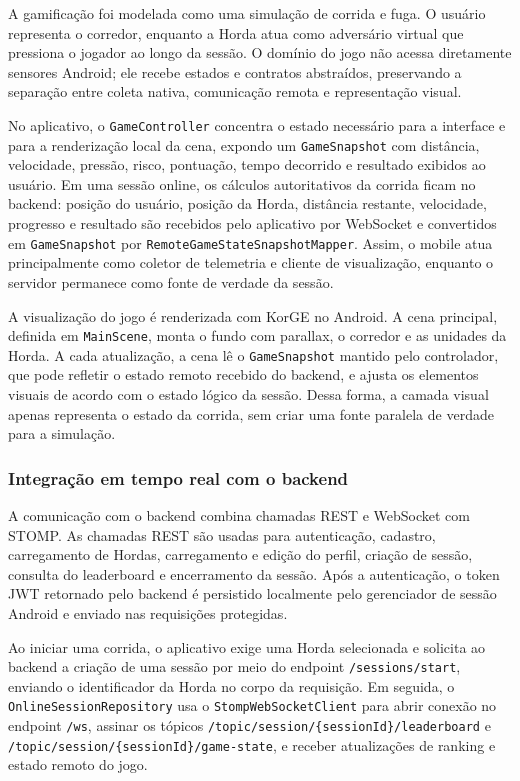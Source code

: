 A gamificação foi modelada como uma simulação de corrida e fuga. O usuário representa o corredor, enquanto a Horda atua como adversário virtual que pressiona o jogador ao longo da sessão. O domínio do jogo não acessa diretamente sensores Android; ele recebe estados e contratos abstraídos, preservando a separação entre coleta nativa, comunicação remota e representação visual.

No aplicativo, o \texttt{GameController} concentra o estado necessário para a interface e para a renderização local da cena, expondo um \texttt{GameSnapshot} com distância, velocidade, pressão, risco, pontuação, tempo decorrido e resultado exibidos ao usuário. Em uma sessão online, os cálculos autoritativos da corrida ficam no backend: posição do usuário, posição da Horda, distância restante, velocidade, progresso e resultado são recebidos pelo aplicativo por WebSocket e convertidos em \texttt{GameSnapshot} por \texttt{RemoteGameStateSnapshotMapper}. Assim, o mobile atua principalmente como coletor de telemetria e cliente de visualização, enquanto o servidor permanece como fonte de verdade da sessão.

A visualização do jogo é renderizada com KorGE no Android. A cena principal, definida em \texttt{MainScene}, monta o fundo com parallax, o corredor e as unidades da Horda. A cada atualização, a cena lê o \texttt{GameSnapshot} mantido pelo controlador, que pode refletir o estado remoto recebido do backend, e ajusta os elementos visuais de acordo com o estado lógico da sessão. Dessa forma, a camada visual apenas representa o estado da corrida, sem criar uma fonte paralela de verdade para a simulação.

\vspace{0.2cm}
\subsubsection{Integração em tempo real com o backend}
\vspace{0.2cm}

A comunicação com o backend combina chamadas REST e WebSocket com STOMP. As chamadas REST são usadas para autenticação, cadastro, carregamento de Hordas, carregamento e edição do perfil, criação de sessão, consulta do leaderboard e encerramento da sessão. Após a autenticação, o token JWT retornado pelo backend é persistido localmente pelo gerenciador de sessão Android e enviado nas requisições protegidas.

Ao iniciar uma corrida, o aplicativo exige uma Horda selecionada e solicita ao backend a criação de uma sessão por meio do endpoint \texttt{/sessions/start}, enviando o identificador da Horda no corpo da requisição. Em seguida, o \texttt{OnlineSessionRepository} usa o \texttt{StompWebSocketClient} para abrir conexão no endpoint \texttt{/ws}, assinar os tópicos \texttt{/topic/session/\{sessionId\}/leaderboard} e \texttt{/topic/session/\{sessionId\}/game-state}, e receber atualizações de ranking e estado remoto do jogo.

